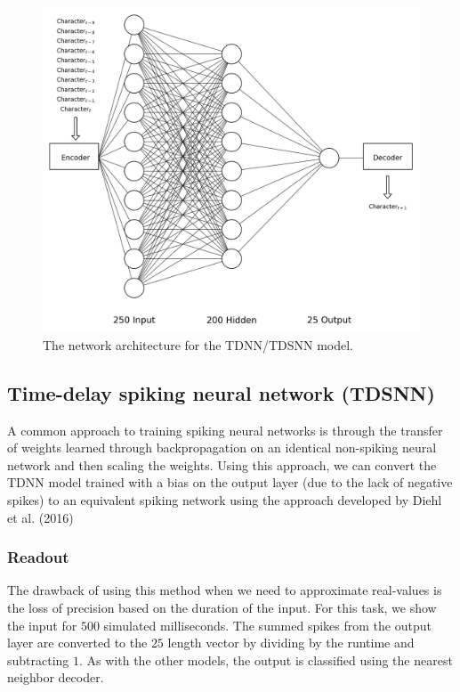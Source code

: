 \documentclass{article}
\begin{document}
\begin{figure}[!h]
    \centering
    \includegraphics[width=0.75\linewidth]{tdnn.png}
    \caption{The network architecture for the TDNN/TDSNN model.}
    \label{fig:lstm-online-model}
\end{figure}

\subsection*{Time-delay spiking neural network (TDSNN)}

A common approach to training spiking neural networks \cite{diehl2015fast} is through the transfer of weights learned through backpropagation on an identical non-spiking neural network and then scaling the weights. Using this approach, we can convert the TDNN model trained with a bias on the output layer (due to the lack of negative spikes) to an equivalent spiking network using the approach developed by Diehl et al. (2016)

\subsubsection*{Readout}

The drawback of using this method when we need to approximate real-values is the loss of precision based on the duration of the input. For this task, we show the input for $500$ simulated milliseconds. The summed spikes from the output layer are converted to the $25$ length vector by dividing by the runtime and subtracting $1$. As with the other models, the output is classified using the nearest neighbor decoder.


\end{document}
